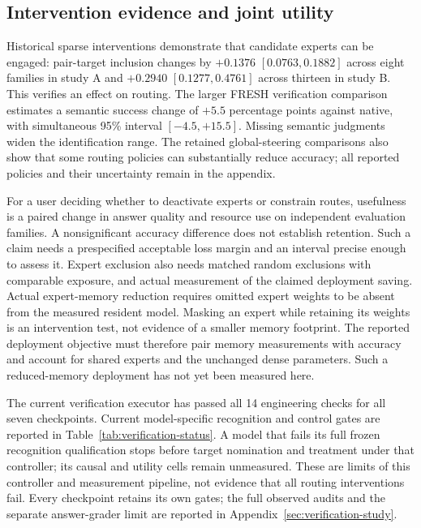

\subsection{Intervention evidence and joint utility}
Historical sparse interventions demonstrate that candidate experts can
be engaged: pair-target inclusion changes by $+0.1376$
$[0.0763,0.1882]$ across eight families in study A and $+0.2940$
$[0.1277,0.4761]$ across thirteen in study B. This verifies an effect on
routing. The larger FRESH verification comparison estimates a semantic
success change of $+5.5$ percentage points against native, with
simultaneous 95\% interval $[-4.5,+15.5]$. Missing semantic judgments widen
the identification range. The retained global-steering comparisons also
show that some routing policies can substantially reduce accuracy; all
reported policies and their uncertainty remain in the appendix.

For a user deciding whether to deactivate experts or constrain routes,
usefulness is a paired change in answer quality and resource use on
independent evaluation families. A nonsignificant accuracy difference
does not establish retention. Such a claim needs a prespecified acceptable
loss margin and an interval precise enough to assess it. Expert exclusion
also needs matched random exclusions with comparable exposure, and actual
measurement of the claimed deployment saving. Actual expert-memory reduction requires omitted expert weights to be
absent from the measured resident model. Masking an expert while retaining
its weights is an intervention test, not evidence of a smaller memory
footprint. The reported deployment objective must therefore pair memory
measurements with accuracy and account for shared experts and the
unchanged dense parameters. Such a reduced-memory deployment has not yet
been measured here.

The current verification executor has passed all 14 engineering checks
for all seven checkpoints. Current model-specific recognition and control
gates are reported in Table~\ref{tab:verification-status}. A model that
fails its full frozen recognition qualification stops before target
nomination and treatment under that controller; its causal and utility
cells remain unmeasured. These are limits of this controller and measurement
pipeline, not evidence that all routing interventions fail. Every checkpoint
retains its own gates; the full observed audits and the separate answer-grader
limit are reported in Appendix~\ref{sec:verification-study}.


